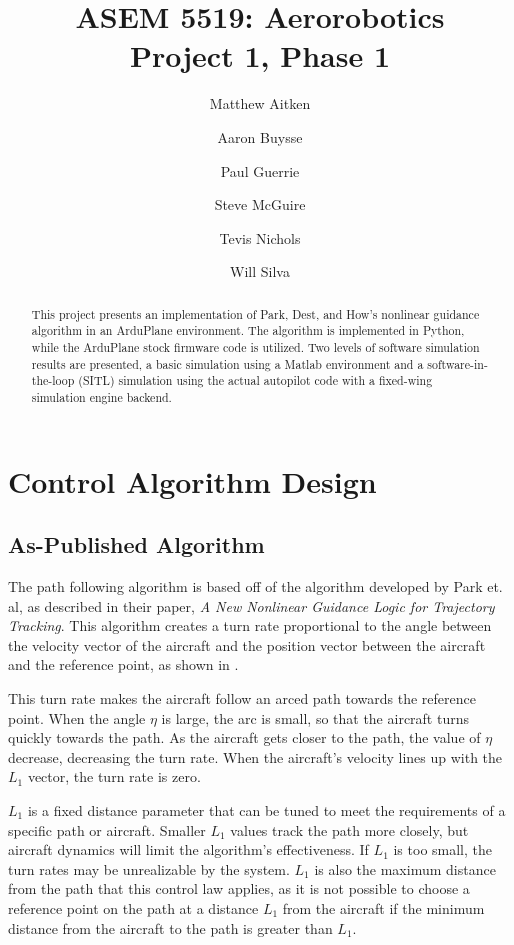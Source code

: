 \documentclass{aiaa}
\title{ASEM 5519: Aerorobotics \\ Project 1, Phase 1}
\author{Matthew Aitken \and Aaron Buysse \and Paul Guerrie \and Steve McGuire
\and Tevis Nichols \and Will Silva}
\begin{document}
\maketitle
\begin{abstract}
This project presents an implementation of Park, Dest, and How's nonlinear guidance algorithm in an ArduPlane environment. The algorithm is implemented in Python, while the ArduPlane stock firmware code is utilized. Two levels of software simulation results are presented, a basic simulation using a Matlab environment and a software-in-the-loop (SITL) simulation using the actual autopilot code with a fixed-wing simulation engine backend.
\end{abstract}

\section{Control Algorithm Design}
\subsection{As-Published Algorithm}
The path following algorithm is based off of the algorithm developed by Park et. al, as described in their paper, \textit{A New Nonlinear Guidance Logic for Trajectory Tracking}. This algorithm creates a turn rate proportional to the angle between the velocity vector of the aircraft and the position vector between the aircraft and the reference point, as shown in .

This turn rate makes the aircraft follow an arced path towards the reference point. When the angle $\eta$ is large, the arc is small, so that the aircraft turns quickly towards the path. As the aircraft gets closer to the path, the value of $\eta$ decrease, decreasing the turn rate. When the aircraft's velocity lines up with the $L_1$ vector, the turn rate is zero.

$L_1$ is a fixed distance parameter that can be tuned to meet the requirements of a specific path or aircraft. Smaller $L_1$ values track the path more closely, but aircraft dynamics will limit the algorithm's effectiveness. If $L_1$ is too small, the turn rates may be unrealizable by the system. $L_1$ is also the maximum distance from the path that this control law applies, as it is not possible to choose a reference point on the path at a distance $L_1$ from the aircraft if the minimum distance from the aircraft to the path is greater than $L_1$.
\end{document}
